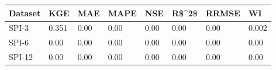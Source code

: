 \begin{tabular}{llllllll}
\toprule
Dataset &   KGE &  MAE & MAPE &  NSE & R\$\textasciicircum 2\$ & RRMSE &    WI \\
\midrule
  SPI-3 & 0.351 & 0.00 & 0.00 & 0.00 &  0.00 &  0.00 & 0.002 \\
  SPI-6 &  0.00 & 0.00 & 0.00 & 0.00 &  0.00 &  0.00 &  0.00 \\
 SPI-12 &  0.00 & 0.00 & 0.00 & 0.00 &  0.00 &  0.00 &  0.00 \\
\bottomrule
\end{tabular}
